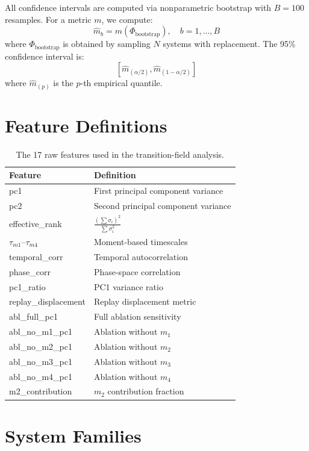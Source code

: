 \documentclass[10pt]{article}
\begin{document}
All confidence intervals are computed via nonparametric bootstrap with $B = 100$ resamples. For a metric $m$, we compute:
\[
\hat{m}_b = m(\Phi_{\text{bootstrap}}), \quad b = 1, \dots, B
\]
where $\Phi_{\text{bootstrap}}$ is obtained by sampling $N$ systems with replacement. The 95\% confidence interval is:
\[
[\hat{m}_{(\alpha/2)}, \hat{m}_{(1-\alpha/2)}]
\]
where $\hat{m}_{(p)}$ is the $p$-th empirical quantile.

\section{Feature Definitions}
\label{sec:features}

\begin{table}[h]
\centering
\caption{The 17 raw features used in the transition-field analysis.}
\begin{tabular}{ll}
\toprule
Feature & Definition \\
\midrule
pc1 & First principal component variance \\
pc2 & Second principal component variance \\
effective_rank & $\frac{(\sum \sigma_i)^2}{\sum \sigma_i^2}$ \\
$\tau_{m1}$--$\tau_{m4}$ & Moment-based timescales \\
temporal_corr & Temporal autocorrelation \\
phase_corr & Phase-space correlation \\
pc1\_ratio & PC1 variance ratio \\
replay\_displacement & Replay displacement metric \\
abl\_full\_pc1 & Full ablation sensitivity \\
abl\_no\_m1\_pc1 & Ablation without $m_1$ \\
abl\_no\_m2\_pc1 & Ablation without $m_2$ \\
abl\_no\_m3\_pc1 & Ablation without $m_3$ \\
abl\_no\_m4\_pc1 & Ablation without $m_4$ \\
m2\_contribution & $m_2$ contribution fraction \\
\bottomrule
\end{tabular}
\end{table}

\section{System Families}
\label{sec:families}
\end{document}
